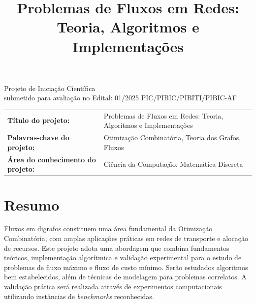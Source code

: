 \documentclass{amsart}
\newcommand{\numedital}{01/2025 PIC/PIBIC/PIBITI/PIBIC-AF}
\newcommand{\longtitle}{Problemas de Fluxos em Redes: Teoria, Algoritmos e Implementações}
\begin{document}
\title[Problemas de Fluxos em Redes]{\longtitle}
\maketitle
\thispagestyle{empty}
\vfill

\begin{flushright}
\begin{minipage}{8cm}
\begin{flushright}
Projeto de Iniciação Científica\\submetido para avaliação no Edital: \numedital
\end{flushright}
\end{minipage}
\end{flushright}

\vfill

\renewcommand{\arraystretch}{2}
\begin{tabular}{ll}
\textbf{Título do projeto:} &
\begin{minipage}[t]{8cm}
\longtitle
\end{minipage}
\\
 \textbf{Palavras-chave do projeto:} &
 \begin{minipage}[t]{8cm}
 Otimização Combinatória, Teoria dos Grafos, Fluxos
 \end{minipage}\\
\textbf{Área do conhecimento do projeto:} &
\begin{minipage}[t]{8cm}
Ciência da Computação, Matemática Discreta
\end{minipage}
\end{tabular}
\newpage

\tableofcontents
\newpage

\section{Resumo}
Fluxos em digrafos constituem uma área fundamental da Otimização Combinatória, com amplas aplicações práticas em redes de transporte e alocação de recursos. Este projeto adota uma abordagem que combina fundamentos teóricos, implementação algorítmica e validação experimental para o estudo de problemas de fluxo máximo e fluxo de custo mínimo. Serão estudados algoritmos bem estabelecidos, além de técnicas de modelagem para problemas correlatos. A validação prática será realizada através de experimentos computacionais utilizando instâncias de \textit{benchmarks} reconhecidas.
\end{document}
